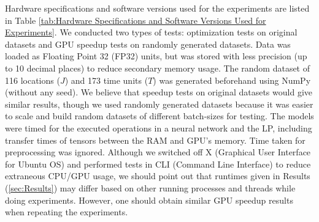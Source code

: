\documentclass[12pt]{article}
\begin{document}
    Hardware specifications and software versions used for the experiments are listed in Table \ref{tab:Hardware Specifications and Software Versions Used for Experiments}. We conducted two types of tests: optimization tests on original datasets and GPU speedup tests on randomly generated datasets. Data was loaded as Floating Point 32 (FP32) units, but was stored with less precision (up to 10 decimal places) to reduce secondary memory usage. The random dataset of 116 locations ($J$) and 173 time units ($T$) was generated beforehand using NumPy (without any seed). We believe that speedup tests on original datasets would give similar results, though we used randomly generated datasets because it was easier to scale and build random datasets of different batch-sizes for testing. The models were timed for the executed operations in a neural network and the LP, including transfer times of tensors between the RAM and GPU's memory. Time taken for preprocessing was ignored. Although we switched off X (Graphical User Interface for Ubuntu OS) and performed tests in CLI (Command Line Interface) to reduce extraneous CPU/GPU usage, we should point out that runtimes given in Results (\cref{sec:Results}) may differ based on other running processes and threads while doing experiments. However, one should obtain similar GPU speedup results when repeating the experiments.
\end{document}
